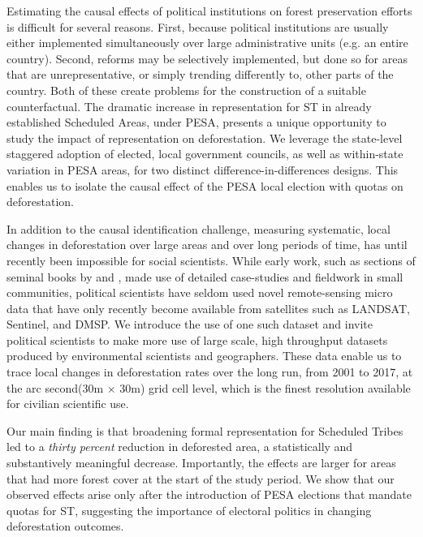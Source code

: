 \documentclass[12pt,reqno]{article}
\begin{document}

Estimating the causal effects of political institutions on forest preservation efforts is difficult for several reasons. First, because political institutions are usually either implemented simultaneously over large administrative units (e.g. an entire country). Second, reforms may be selectively implemented, but done so for areas that are unrepresentative, or simply trending differently to, other parts of the country. Both of these create problems for the construction of a suitable counterfactual. The dramatic increase in representation for ST in already established Scheduled Areas, under PESA, presents a unique opportunity to study the impact of representation on deforestation. We leverage the state-level staggered adoption of elected, local government councils, as well as within-state variation in PESA areas, for two distinct difference-in-differences designs. This enables us to isolate the causal effect of the PESA local election with quotas on deforestation. 

In addition to the causal identification challenge, measuring systematic, local changes in deforestation over large areas and over long periods of time, has until recently been impossible for social scientists. While early work, such as sections of seminal books by \textcite{ostrom1990governing} and \textcite{ellickson1991order}, made use of detailed case-studies and fieldwork in small communities, political scientists have seldom used novel remote-sensing micro data that have only recently become available from satellites such as LANDSAT, Sentinel, and DMSP. We introduce the use of one such dataset and invite political scientists to make more use of large scale, high throughput datasets produced by environmental scientists and geographers. These data enable us to trace local changes in deforestation rates over the long run, from 2001 to 2017, at the arc second(30m $\times$ 30m) grid cell level, which is the finest resolution available for civilian scientific use. %



Our main finding is that broadening formal representation for Scheduled Tribes led to a {\it thirty percent} reduction in deforested area, a statistically and substantively meaningful decrease. Importantly, the effects are larger for areas that had more forest cover at the start of the study period. We show that our observed effects arise only after the introduction of PESA elections that mandate quotas for ST, suggesting the importance of electoral politics in changing deforestation outcomes. 
\end{document}
